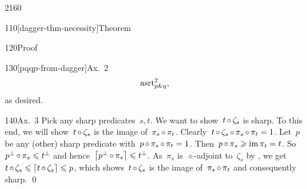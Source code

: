 \begin{parsec}{2160}
\begin{point}{110}[dagger-thm-necessity]{Theorem}
\begin{point}{120}{Proof}
\begin{point}{130}[pqqp-from-dagger]{Ax.~2}
\begin{align*}
    \mathrm{asrt}_{p \mathbin{\&} q}^2,
\end{align*}
as desired.
\end{point}
\begin{point}{140}{Ax.~3}%
Pick any sharp predicates~$s,t$.
We want to show~$t \mathop{\circ} \zeta_s$ is sharp.
To this end, we will show~$t \mathop{\circ} \zeta_s$
    is the image of~$\pi_s \mathop{\circ} \pi_t$.
Clearly~$t \mathop{\circ} \zeta_s \mathop{\circ} \pi_s \mathop{\circ} \pi_t = 1$.
Let~$p$ be any (other) sharp predicate with~$p \mathop{\circ} \pi_s \mathop{\circ} \pi_t = 1$.
Then~$p \mathop{\circ} \pi_s \geqslant \operatorname{im} \pi_t = t$.
So~$  p^\perp \mathop{\circ} \pi_s \leqslant t^\perp$
and hence~$\left\lceil p^\perp \mathop{\circ} \pi_s\right\rceil \leqslant t^\perp$.
As~$\pi_s$ is~$\diamond$-adjoint to~$\zeta_s$ by ,
we get~$t \mathop{\circ} \zeta_s \leqslant \left\lceil t \mathop{\circ} \zeta_s\right\rceil \leqslant p$,
    which shows~$t \mathop{\circ} \zeta_s$
    is the image of~$\pi_s \mathop{\circ} \pi_t$
    and consequently sharp. \qed
\end{point}
\end{point}
\end{point}

    
\end{parsec}

